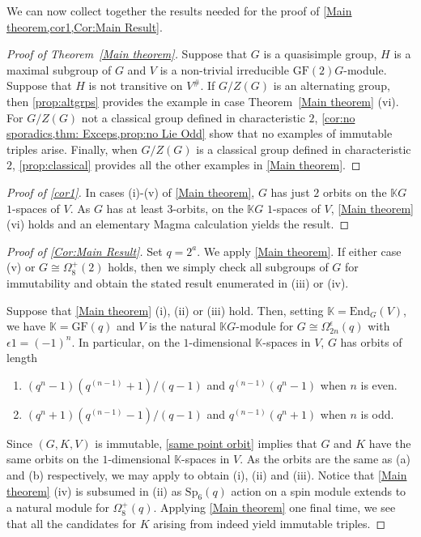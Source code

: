 \documentclass[12pt]{amsart}
\theoremstyle{remark}
\theoremstyle{notation}
\theoremstyle{definition}
\newcommand{\GF}{\mathrm{GF}}
\newcommand{\Sp}{\mathrm{Sp}}
\newcommand{\0}{\emptyset}
\begin{document}
We can now collect together the results needed for the proof of \cref{Main theorem,cor1,Cor:Main Result}.
\begin{proof}[Proof of Theorem~\ref{Main theorem}] Suppose that $G$ is a quasisimple group, $H$ is a maximal subgroup of $G$ and $V$ is a non-trivial irreducible $\GF(2)G$-module. Suppose that $H$ is not transitive on $V^\#$. If $G/Z(G)$ is an alternating group, then \cref{prop:altgrps} provides the example in case Theorem~\ref{Main theorem} (vi). For $G/Z(G)$ not a classical group defined in characteristic $2$,
\cref{cor:no sporadics,thm: Exceps,prop:no Lie Odd} show that no examples of immutable triples arise. Finally, when $G/Z(G)$ is a classical group defined in characteristic $2$, \cref{prop:classical} provides all the other examples in \cref{Main theorem}.
\end{proof}

\begin{proof}[Proof of \cref{cor1}]  In cases (i)-(v) of \cref{Main theorem}, $G$ has just $2$ orbits on the $\mathbb KG$ $1$-spaces of $V$. As $G$ has at least $3$-orbits, on the $\mathbb KG$ $1$-spaces of $V$, \cref{Main theorem} (vi) holds and an elementary {\sc Magma} calculation yields the result.
\end{proof}


\begin{proof}[Proof of \cref{Cor:Main Result}] Set $q=2^a$. We apply \cref{Main theorem}. If either case (v) or $G \cong \Omega_8^+(2)$ holds, then we simply check all subgroups of $G$ for immutability and obtain the stated result enumerated in (iii) or (iv).

Suppose that \cref{Main theorem} (i), (ii) or (iii) hold. Then, setting $\mathbb K=\mathrm{End}_G(V)$, we have $\mathbb K= \GF(q)$ and $V$ is the natural $\mathbb KG$-module for $G\cong \Omega^{\epsilon}_{2n}(q)$ with $\epsilon 1= (-1)^n$.
In particular, on the $1$-dimensional $\mathbb K$-spaces in $V$, $G$ has orbits of length
\begin{enumerate}
\item[(a)] $(q^n-1)(q^{(n-1)}+1)/(q-1)$ and $q^{(n-1)}(q^{n}-1)$ when $n$ is even.
\item[(b)]   $(q^{n}+1)(q^{(n-1)}-1)/(q-1)$ and $ q^{(n-1)}(q^{n}+1) $ when $n$ is odd.
\end{enumerate}
Since $(G,K,V)$ is immutable, \cref{same point orbit} implies that $G$ and $K$ have the same orbits on the $1$-dimensional $\mathbb K$-spaces in $V$. As the orbits \cite[Table 1 (2) and (3) with $q$ even]{Liebeck} are the same as (a) and (b) respectively, we may apply \cite[Theorem]{Liebeck} to obtain (i), (ii) and (iii). Notice that \cref{Main theorem} (iv) is subsumed in (ii) as $\Sp_6(q)$ action on a spin module extends to a natural module for $\Omega_8^+(q)$. Applying \cref{Main theorem} one final time, we see that all the candidates for $K$ arising from  \cite[Theorem]{Liebeck}  indeed yield immutable triples.
\end{proof}
\end{document}
